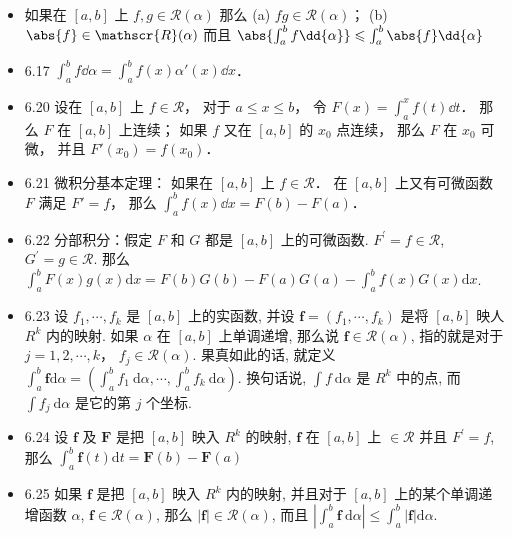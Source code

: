 \begin{itemize}
\item 如果在 $[a,b]$ 上 $f,g\in \mathscr{R}(\alpha)$ 那么 (a) $fg\in \mathscr{R}(\alpha)$； (b) $\abs{f}\in \mathscr{R}(\alpha)$ 而且 $\abs{\int_a^bf\dd{\alpha}} \leqslant \int_a^b\abs{f}\dd{\alpha}$

\item 6.17 $\int_a^b f\dd{\alpha} = \int_a^b f(x)\alpha'(x)\dd{x}$．

\item 6.20 设在 $[a,b]$ 上 $f\in \mathscr{R}$， 对于 $a\leqslant x\leqslant b$， 令 $F(x) = \int_a^x f(t)\dd{t}$． 那么 $F$ 在 $[a,b]$ 上连续； 如果 $f$ 又在 $[a,b]$ 的 $x_0$ 点连续， 那么 $F$ 在 $x_0$ 可微， 并且 $F'(x_0) = f(x_0)$．

\item 6.21 微积分基本定理： 如果在 $[a,b]$ 上 $f\in \mathscr{R}$． 在 $[a,b]$ 上又有可微函数 $F$ 满足 $F' = f$， 那么 $\int_a^b f(x)\dd{x} = F(b)-F(a)$．

\item 6.22 分部积分：假定 $F$ 和 $G$ 都是 $[a, b]$ 上的可微函数. $F^{\prime}=f \in \mathscr{R}$, $G^{\prime}=g \in \mathscr{R}$. 那么 $\int_{a}^{b} F(x) g(x) \mathrm{d} x=F(b) G(b)-F(a) G(a)-\int_{a}^{b} f(x) G(x) \mathrm{d} x$.

\item 6.23 设 $f_{1}, \cdots, f_{k}$ 是 $[a, b]$ 上的实函数, 并设 $\boldsymbol{f}=\left(f_{1}, \cdots, f_{k}\right)$ 是将 $[a, b]$ 映人 $R^{k}$ 内的映射. 如果 $\alpha$ 在 $[a, b]$ 上单调递增, 那么说 $\boldsymbol f \in \mathscr{R}(\alpha)$, 指的就是对于 $j=1,2, \cdots, k$， $f_{j} \in \mathscr{R}(\alpha)$. 果真如此的话, 就定义 $\int_{a}^{b} \boldsymbol{f} \mathrm{d} \alpha=\left(\int_{a}^{b} f_{1} \mathrm{~d} \alpha, \cdots, \int_{a}^{b} f_{k} \mathrm{~d} \alpha\right)$. 换句话说, $\int f \mathrm{~d} \alpha$ 是 $R^{k}$ 中的点, 而 $\int f_{j} \mathrm{~d} \alpha$ 是它的第 $j$ 个坐标.

\item 6.24 设 $\boldsymbol{f}$ 及 $\boldsymbol{F}$ 是把 $[a, b]$ 映入 $R^{k}$ 的映射, $\boldsymbol{f}$ 在 $[a, b]$ 上 $\in \mathscr{R}$ 并且 $F^{\prime}=f$, 那么 $\int_{a}^{b} \boldsymbol{f}(t) \mathrm{d} t=\boldsymbol{F}(b)-\boldsymbol{F}(a)$

\item 6.25 如果 $\boldsymbol f$ 是把 $[a, b]$ 映入 $R^{k}$ 内的映射, 并且对于 $[a, b]$ 上的某个单调递增函数 $\alpha$, $\boldsymbol f \in \mathscr{R}(\alpha)$, 那么 $|\boldsymbol f| \in \mathscr{R}(\alpha)$, 而且 $\left|\int_{a}^{b} \boldsymbol f \mathrm{~d} \alpha\right| \leqslant \int_{a}^{b}|\boldsymbol f| \mathrm{d} \alpha$.


\end{itemize}

